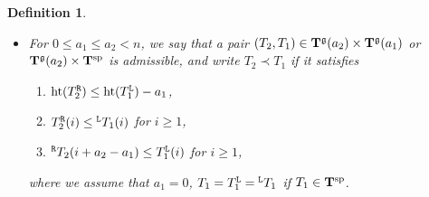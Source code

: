 \documentclass[leqno,11pt]{amsart}
\newtheorem{df}[thm]{\bf Definition}
\numberwithin{equation}{section}
\newcommand{\mf}{\mathfrak}
\begin{document}
\begin{df}\label{def:psst}{\rm \mbox{}
\begin{itemize}
\item[(1)]
For $0\leq a_1\leq a_2<n$, we say that a pair  $(T_2,T_1)\in {\bf T}^{\mf g}(a_2)\times {\bf T}^{\mf g}(a_1)$ or ${\bf T}^{\mf g}(a_2)\times  {\bf T}^{\rm sp}$ is {\em admissible}, and write  $T_2\prec T_1$ if it satisfies

\begin{enumerate}
\item[(i)]  ${\rm ht}({T}^{\tt R}_2)\leq {\rm ht}(T^{\tt L}_1) -a_1$,

\item[(ii)] ${T}^{\tt R}_2(i)\leq  {}^{\tt L}T_1(i)$ for $i\geq 1$,

\item[(iii)] ${}^{\tt R}T_2(i+a_2-a_1)\leq {T}^{\tt L}_1(i)$ for $i\geq 1$,
\end{enumerate}
where we assume that $a_1=0$, $T_1=T_1^{\tt L}={}^{\tt L}T_1$ if $T_1\in {\bf T}^{\rm sp}$.



\end{itemize}}
\end{df}
\end{document}
